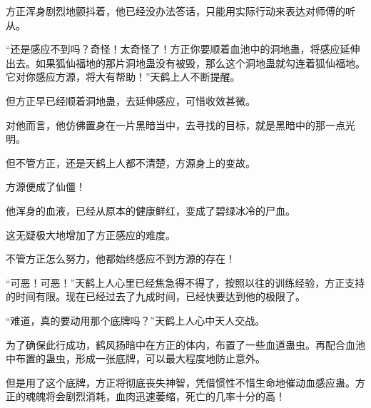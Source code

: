 \begin{this_body}
方正浑身剧烈地颤抖着，他已经没办法答话，只能用实际行动来表达对师傅的听从。

“还是感应不到吗？奇怪！太奇怪了！方正你要顺着血池中的洞地蛊，将感应延伸出去。如果狐仙福地的那片洞地蛊没有被毁，那么这个洞地蛊就勾连着狐仙福地。它对你感应方源，将大有帮助！”天鹤上人不断提醒。

但方正早已经顺着洞地蛊，去延伸感应，可惜收效甚微。

对他而言，他仿佛置身在一片黑暗当中，去寻找的目标，就是黑暗中的那一点光明。

但不管方正，还是天鹤上人都不清楚，方源身上的变故。

方源便成了仙僵！

他浑身的血液，已经从原本的健康鲜红，变成了碧绿冰冷的尸血。

这无疑极大地增加了方正感应的难度。

不管方正怎么努力，他都始终感应不到方源的存在！

“可恶！可恶！”天鹤上人心里已经焦急得不得了，按照以往的训练经验，方正支持的时间有限。现在已经过去了九成时间，已经快要达到他的极限了。

“难道，真的要动用那个底牌吗？”天鹤上人心中天人交战。

为了确保此行成功，鹤风扬暗中在方正的体内，布置了一些血道蛊虫。再配合血池中布置的蛊虫，形成一张底牌，可以最大程度地防止意外。

但是用了这个底牌，方正将彻底丧失神智，凭借惯性不惜生命地催动血感应蛊。方正的魂魄将会剧烈消耗，血肉迅速萎缩，死亡的几率十分的高！

\end{this_body}

